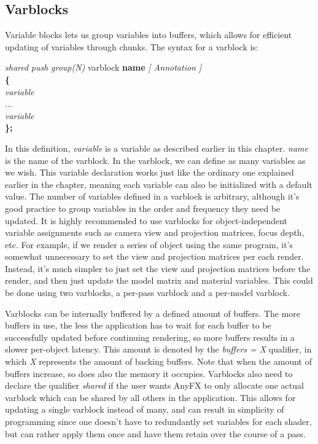 \documentclass{article}
\newcommand{\SyntaxBox}[1]
{	
	\begin{center}
	\colorbox{orange!60}
	{
		\begin{minipage}{\linewidth}
		\hfill
		\begin{tabbing}
		#1
		\end{tabbing}
		\end{minipage}
	}
	\end{center}
}
\begin{document}
\subsection{Varblocks}
Variable blocks lets us group variables into buffers, which allows for efficient updating of variables through chunks. The syntax for a varblock is:

\SyntaxBox
{
	\textit{shared} \textit{push} \textit{group(N)} varblock \textbf{name} \textit{[ Annotation ]} \\
	\textbf{\{} \= \\
	\>	\textit{variable} \\
	\>	...	\\
	\>	\textit{variable} \\
	\textbf{\};}
}

In this definition, \textit{variable} is a variable as described earlier in this chapter. \textit{name} is the name of the varblock. In the varblock, we can define as many variables as we wish. This variable declaration works just like the ordinary one explained earlier in the chapter, meaning each variable can also be initialized with a default value. The number of variables defined in a varblock is arbitrary, although it's good practice to group variables in the order and frequency they need be updated. It is highly recommended to use varblocks for object-independent variable assignments such as camera view and projection matrices, focus depth, etc. For example, if we render a series of object using the same program, it's somewhat unnecessary to set the view and projection matrices per each render. Instead, it's much simpler to just set the view and projection matrices before the render, and then just update the model matrix and material variables. This could be done using two varblocks, a per-pass varblock and a per-model varblock. 

Varblocks can be internally buffered by a defined amount of buffers. The more buffers in use, the less the application has to wait for each buffer to be successfully updated before continuing rendering, so more buffers results in a slower per-object latency. This amount is denoted by the \textit{buffers = X} qualifier, in which \textit{X} represents the amount of backing buffers. Note that when the amount of buffers increase, so does also the memory it occupies. Varblocks also need to declare the qualifier \textit{shared} if the user wants AnyFX to only allocate one actual varblock which can be shared by all others in the application. This allows for updating a single varblock instead of many, and can result in simplicity of programming since one doesn't have to redundantly set variables for each shader, but can rather apply them once and have them retain over the course of a pass. 
\end{document}
